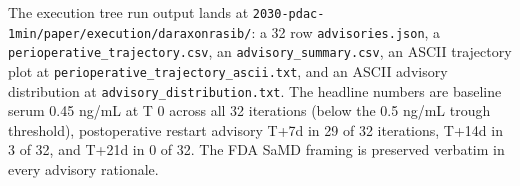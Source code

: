 The execution tree run output lands at
\texttt{2030-pdac-1min/paper/execution/daraxonrasib/}: a 32 row
\texttt{advisories.json}, a \texttt{perioperative_trajectory.csv},
an \texttt{advisory_summary.csv}, an ASCII trajectory plot at
\texttt{perioperative_trajectory_ascii.txt}, and an ASCII advisory
distribution at \texttt{advisory_distribution.txt}. The headline
numbers are baseline serum 0.45 ng/mL at T 0 across all 32
iterations (below the 0.5 ng/mL trough threshold), postoperative
restart advisory T+7d in 29 of 32 iterations, T+14d in 3 of 32,
and T+21d in 0 of 32. The FDA SaMD \cite{fda-samd} framing is
preserved verbatim in every advisory rationale.
